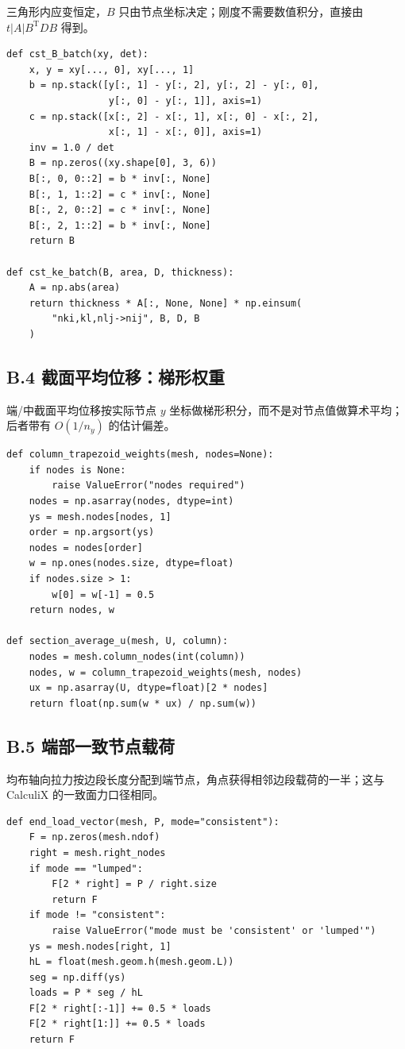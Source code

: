 三角形内应变恒定，$B$ 只由节点坐标决定；刚度不需要数值积分，直接由 $t|A|B^{\mathrm T}DB$ 得到。

\begin{lstlisting}
def cst_B_batch(xy, det):
    x, y = xy[..., 0], xy[..., 1]
    b = np.stack([y[:, 1] - y[:, 2], y[:, 2] - y[:, 0],
                  y[:, 0] - y[:, 1]], axis=1)
    c = np.stack([x[:, 2] - x[:, 1], x[:, 0] - x[:, 2],
                  x[:, 1] - x[:, 0]], axis=1)
    inv = 1.0 / det
    B = np.zeros((xy.shape[0], 3, 6))
    B[:, 0, 0::2] = b * inv[:, None]
    B[:, 1, 1::2] = c * inv[:, None]
    B[:, 2, 0::2] = c * inv[:, None]
    B[:, 2, 1::2] = b * inv[:, None]
    return B

def cst_ke_batch(B, area, D, thickness):
    A = np.abs(area)
    return thickness * A[:, None, None] * np.einsum(
        "nki,kl,nlj->nij", B, D, B
    )
\end{lstlisting}

\subsection*{B.4 截面平均位移：梯形权重}

端/中截面平均位移按实际节点 $y$ 坐标做梯形积分，而不是对节点值做算术平均；后者带有 $O(1/n_y)$ 的估计偏差。

\begin{lstlisting}
def column_trapezoid_weights(mesh, nodes=None):
    if nodes is None:
        raise ValueError("nodes required")
    nodes = np.asarray(nodes, dtype=int)
    ys = mesh.nodes[nodes, 1]
    order = np.argsort(ys)
    nodes = nodes[order]
    w = np.ones(nodes.size, dtype=float)
    if nodes.size > 1:
        w[0] = w[-1] = 0.5
    return nodes, w

def section_average_u(mesh, U, column):
    nodes = mesh.column_nodes(int(column))
    nodes, w = column_trapezoid_weights(mesh, nodes)
    ux = np.asarray(U, dtype=float)[2 * nodes]
    return float(np.sum(w * ux) / np.sum(w))
\end{lstlisting}

\newpage
\subsection*{B.5 端部一致节点载荷}

均布轴向拉力按边段长度分配到端节点，角点获得相邻边段载荷的一半；这与 CalculiX 的一致面力口径相同。

\begin{lstlisting}
def end_load_vector(mesh, P, mode="consistent"):
    F = np.zeros(mesh.ndof)
    right = mesh.right_nodes
    if mode == "lumped":
        F[2 * right] = P / right.size
        return F
    if mode != "consistent":
        raise ValueError("mode must be 'consistent' or 'lumped'")
    ys = mesh.nodes[right, 1]
    hL = float(mesh.geom.h(mesh.geom.L))
    seg = np.diff(ys)
    loads = P * seg / hL
    F[2 * right[:-1]] += 0.5 * loads
    F[2 * right[1:]] += 0.5 * loads
    return F
\end{lstlisting}